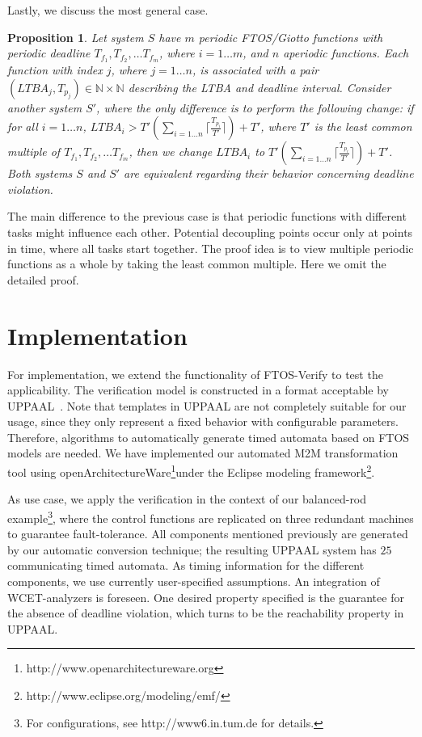 \documentclass[10pt, a4paper, onecolumn, conference, compsocconf]{IEEEtran}
\newtheorem{prop}{Proposition}
\begin{document}
Lastly, we discuss the most general case.

\begin{prop}\label{more.tasks}
Let system $S$ have $m$ periodic FTOS/Giotto functions with periodic deadline $T_{f_1}, T_{f_2},\ldots T_{f_m}$, where $i= 1\ldots m$, and
$n$ aperiodic functions. Each function with index $j$, where $j= 1\ldots n$, is associated with a pair
 $(LTBA_j, T_{p_j})\in \mathbb{N}\times\mathbb{N}$ describing the LTBA and deadline interval.
 Consider another system $S'$, where the only difference is to perform the following change: if for all $i= 1\ldots n$,
$LTBA_i > T'(\sum_{i= 1 \ldots n}\lceil\frac{ T_{p_i}}{T'}\rceil) + T'$, where $T'$ is the least common multiple of
$T_{f_1}, T_{f_2},\ldots T_{f_m}$, then we change $LTBA_i$ to $T'(\sum_{i= 1 \ldots
n}\lceil\frac{ T_{p_i}}{T'}\rceil) + T'$. Both systems $S$ and $S'$
are equivalent regarding their behavior concerning deadline
violation.
\end{prop}

\begin{IEEEproof}The main difference to the previous case is that periodic functions with different tasks might influence each other. Potential decoupling points occur only at points in time, where all tasks start together. The proof idea is to view multiple periodic functions as a whole by taking the least common multiple. Here we omit the detailed proof.
\end{IEEEproof}



\section{Implementation\label{sec.Implementation}}


For implementation, we extend the functionality of FTOS-Verify to test the applicability. The verification model is constructed in a format acceptable by UPPAAL~\cite{bdl:2004:uppaal}.
Note that templates in UPPAAL are not completely suitable for our usage, since they only represent a fixed behavior with configurable
parameters. Therefore, algorithms to automatically generate timed automata based on FTOS models are needed. We have implemented our automated M2M transformation tool using openArchitectureWare\footnote{http://www.openarchitectureware.org}under the Eclipse modeling framework\footnote{http://www.eclipse.org/modeling/emf/}.

As use case, we apply the verification in the context of our balanced-rod example\footnote{For configurations, see http://www6.in.tum.de for details.}, where the control functions are replicated on three redundant machines to guarantee fault-tolerance. All components mentioned previously are generated by our automatic conversion technique; the resulting UPPAAL system has $25$ communicating timed automata. As timing information for the different components, we use currently user-specified assumptions. An integration of WCET-analyzers is foreseen. One desired property specified is the guarantee for the absence of deadline violation, which turns to be the reachability property in UPPAAL.
\end{document}
